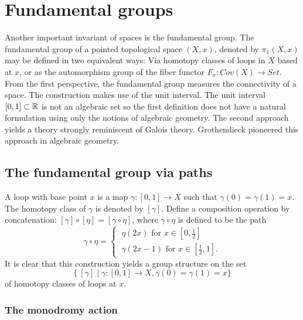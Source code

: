 \section{Fundamental groups}
Another important invariant of spaces is the fundamental group. The fundamental group of a pointed topological space $(X,x)$, denoted by $\pi_1(X,x)$ may be defined in two equivalent ways: Via homotopy classes of loops in $X$ based at $x$, or as the automorphism group of the fiber functor $F_x: Cov(X) \to Set$. From the first perspective, the fundamental group measures the connectivity of a space. The construction makes use of the unit interval. The unit interval $[0,1] \subset \mathbb{R}$ is not an algebraic set so the first definition does not have a natural formulation using only the notions of algebraic geometry. The second approach yields a theory strongly reminiscent of Galois theory. Grothendieck pioneered this approach in algebraic geometry.

\subsection{The fundamental group via paths}
    A loop with base point $x$ is a map $\gamma : [0,1] \to X$ such that $\gamma(0) = \gamma(1) = x$. The homotopy class of $\gamma $ is denoted by $[\gamma]$. Define a composition operation by concatenation: $[\gamma] \circ [\eta] = [\gamma \circ \eta]$, where $\gamma \circ \eta$ is defined to be the path 
    \[
      \gamma \circ \eta =
        \begin{cases}
            \ \eta(2x) \text{ for } x \in [0, \tfrac{1}{2}]\\
            \ \gamma(2x - 1) \text{ for } x \in [\tfrac{1}{2}, 1].
        \end{cases}
    \]
    It is clear that this construction yields a group structure on the set 
    \[
        \{\ [\gamma] \mid \gamma : [0,1] \to X , \gamma(0) = \gamma(1) = x \}
    \]
    of homotopy classes of loops at $x$.

\subsubsection{The monodromy action}

